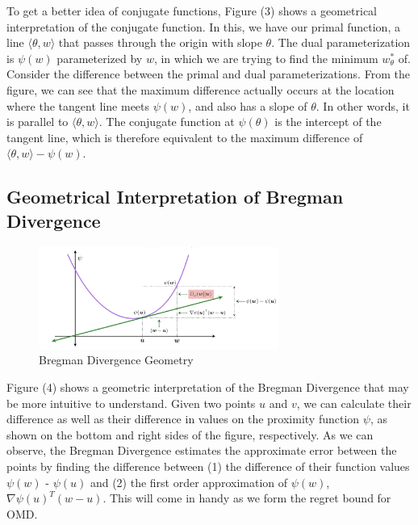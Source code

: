 \documentclass[11pt]{article}
\begin{document}
To get a better idea of conjugate functions, Figure (3) shows a geometrical interpretation of the conjugate function. In this, we have our primal function, a line $\langle \theta, w \rangle$ that passes through the origin with slope $\theta$. The dual parameterization is $\psi(w)$ parameterized by $w$, in which we are trying to find the minimum $w_{\theta}^*$ of. Consider the difference between the primal and dual parameterizations. From the figure, we can see that the maximum difference actually occurs at the location where the tangent line meets $\psi(w)$, and also has a slope of $\theta$. In other words, it is parallel to $\langle \theta, w \rangle$. The conjugate function at $\psi (\theta)$ is the intercept of the tangent line, which is therefore equivalent to the maximum difference of $\langle \theta, w \rangle - \psi(w)$.


\subsection{Geometrical Interpretation of Bregman Divergence}

\begin{figure}[H]
    \centering
    \includegraphics[width=0.7\textwidth]{figs/bregman_geometry.png}
    \caption{Bregman Divergence Geometry}
    \label{fig:bregman}
\end{figure}

Figure (4) shows a geometric interpretation of the Bregman Divergence that may be more intuitive to understand. Given two points $u$ and $v$, we can calculate their difference as well as their difference in values on the proximity function $\psi$, as shown on the bottom and right sides of the figure, respectively. As we can observe, the Bregman Divergence estimates the approximate error between the points by finding the difference between (1) the difference of their function values $\psi(w)$ - $\psi(u)$ and (2) the first order approximation of $\psi(w)$, $\nabla \psi (u)^T(w-u)$. This will come in handy as we form the regret bound for OMD.


\end{document}
